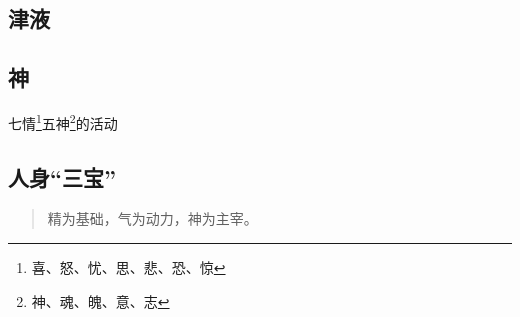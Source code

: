 \subsection{津液}


\subsection{神}
七情\footnote{喜、怒、忧、思、悲、恐、惊}五神\footnote{神、魂、魄、意、志}的活动

\subsection{人身“三宝”}
\begin{quote}
  精为基础，气为动力，神为主宰。
\end{quote}
